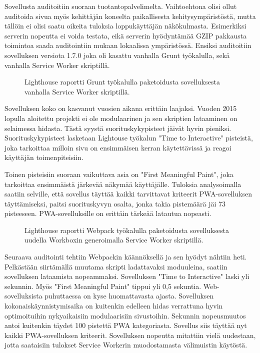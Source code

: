 \documentclass{tktltiki}
\begin{document}
\clearpage

Sovellusta auditoitiin suoraan tuotantopalvelimelta. Vaihtoehtona olisi ollut auditoida sivua myös kehittäjän koneelta paikallisesta kehitysympäristöstä, mutta tällöin ei olisi saatu oikeita tuloksia loppukäyttäjän näkökulmasta. Esimerkiksi serverin nopeutta ei voida testata, eikä serverin hyödyntämää GZIP pakkausta toimintoa saada auditointiin mukaan lokaalissa ympäristössä. Ensiksi auditoitiin sovelluksen versiota 1.7.0 joka oli kasattu vanhalla Grunt työkalulla, sekä vanhalla Service Worker skriptillä. 

\begin{figure}[h]
\begin{center}
\caption{Lighthouse raportti Grunt työkalulla paketoidusta sovelluksesta vanhalla Service Worker skriptillä.}
\label{Lighthouse raportti 1}
\end{center}
\end{figure}

\clearpage

Sovelluksen koko on kasvanut vuosien aikana erittäin laajaksi. Vuoden 2015 lopulla aloitettu projekti ei ole modulaarinen ja sen skriptien lataaminen on selaimessa hidasta. Tästä syystä suorituskykypisteet jäivät hyvin pieniksi. Suorituskykypisteet lasketaan Lightouse työkalun "Time to Interactive" pisteistä, joka tarkoittaa milloin sivu on ensimmäisen kerran käytettävissä ja reagoi käyttäjän toimenpiteisiin. 

Toinen pisteisiin suoraan vaikuttava asia on "First Meaningful Paint", joka tarkoittaa ensimmäistä järkevää näkymää käyttäjälle. Tuloksia analysoimalla saatiin selville, että sovellus täyttää kaikki tarvittavat kriteerit PWA-sovelluksen täyttämiseksi, paitsi suorituskyvyn osalta, jonka takia pistemäärä jäi 73 pisteeseen. PWA-sovelluksille on erittäin tärkeää latautua nopeasti. 


\begin{figure}[!h]
\begin{center}
\caption{Lighthouse raportti Webpack työkalulla paketoidusta sovelluksesta uudella Workboxin generoimalla Service Worker skriptillä.}
\label{Lighthouse raportti 2}
\end{center}
\end{figure}

\clearpage

Seuraava auditointi tehtiin Webpackin käännöksellä ja sen hyödyt nähtiin heti. Pelkästään siirtämällä muutama skripti ladattavaksi moduuleina, saatiin sovelluksen lataamista nopeammaksi. Sovelluksen "Time to Interactive" laski yli sekunnin. Myös "First Meaningful Paint" tippui yli 0,5 sekuntia. Web-sovelluksista puhuttaessa on kyse huomattavasta ajasta. Sovelluksen kokonaiskäynnistymisaika on kuitenkin edelleen hidas verrattuna hyvin optimoituihin nykyaikaisiin modulaarisiin sivustoihin. Sekunnin nopeusmuutos antoi kuitenkin täydet 100 pistettä PWA kategoriasta. Sovellus siis täyttää nyt kaikki PWA-sovelluksen kriteerit. Sovelluksen nopeutta mitattiin vielä uudestaan, jotta saataisiin tulokset Service Workerin muodostamasta välimuistin käytöstä.
\end{document}
